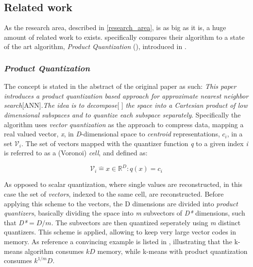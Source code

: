 \subsection{Related work}
\label{state_of_the_art}
As the research area, described in \ref{research_area}, is as big as it is, a huge amount of related work to \qs{} exists. \cite{wagner17} specifically compares their algorithm to a state of the art algorithm, \textit{Product Quantization} (\pq{}), introduced in \cite{schmid9}. %

\subsubsection{\textit{Product Quantization}}
The \pq{} concept is stated in the abstract of the original paper as such: \textit{This paper introduces a product quantization based approach for approximate nearest neighbor search}[ANN].\textit{The idea is to decompose}[ ] \textit{the space into a Cartesian product of low dimensional subspaces and to quantize each subspace separately}. Specifically the algorithm uses \textit{vector quantization} as the approach to compress data, mapping a real valued vector, \textit{x}, in \textit{D}-dimensional space to \textit{centroid} representations, \textit{$c_i$}, in a set $\mathcal{V}_i$\cite[p.3 II-A]{schmid9}. The set of vectors mapped with the quantizer function \textit{q} to a given index \textit{i} is referred to as a (Voronoi) \textit{cell}, and defined as:

\begin{equation}
	\mathcal{V}_i\mathrel{\hat=}{x\in\mathbb{R}^D : q(x)=c_i}
\end{equation}

As opposed to scalar quantization, where single values are reconstructed, in this case the set of \textit{vectors}, indexed to the same cell, are reconstructed. Before applying this scheme to the vectors, the D dimensions are divided into \textit{product quantizers}, basically dividing the space into \textit{m} subvectors of \textit{D*} dimensions, such that \textit{D*$=D/m$}\cite[p.3 II-B]{schmid9}. The subvectors are then quantized seperately using \textit{m} distinct quantizers. This scheme is applied, allowing to keep very large vector codes in memory. As reference a convincing example is listed in \cite[Table I, p. 4]{schmid9}, illustrating that the k-means algorithm consumes $kD$ memory, while k-means with product quantization consumes  $k^{1/m}D$.

